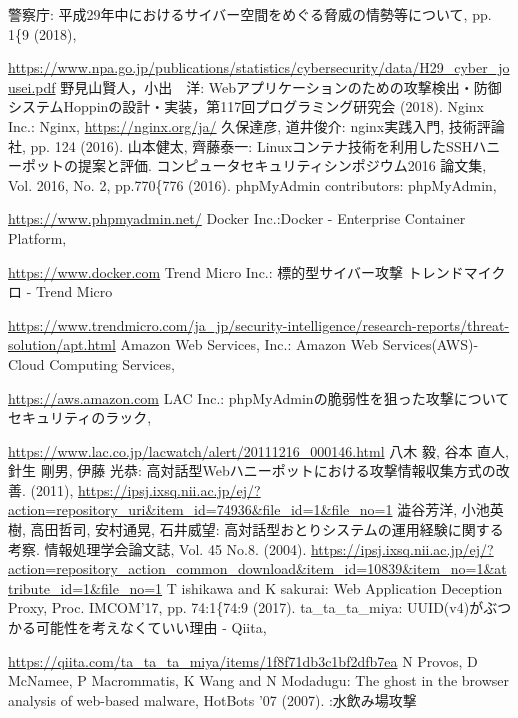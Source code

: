 \documentclass[submit,techrep,noauthor]{ipsj}
\begin{document}
\begin{thebibliography}{16}
 警察庁: 平成29年中におけるサイバー空間をめぐる脅威の情勢等について, pp. 1\{9 (2018),\par
\url{https://www.npa.go.jp/publications/statistics/cybersecurity/data/H29_cyber_jousei.pdf}
 野見山賢人，小出　洋: Webアプリケーションのための攻撃検出・防御システムHoppinの設計・実装，第117回プログラミング研究会  (2018).
 Nginx Inc.: Nginx, \url{https://nginx.org/ja/}
 久保達彦, 道井俊介: nginx実践入門, 技術評論社, pp. 124 (2016).
 山本健太, 齊藤泰一: Linuxコンテナ技術を利用したSSHハニーポットの提案と評価. コンピュータセキュリティシンポジウム2016 論文集, Vol. 2016, No. 2, pp.770\{776 (2016).
 phpMyAdmin contributors: phpMyAdmin, \par
\url{https://www.phpmyadmin.net/}
 Docker Inc.:Docker - Enterprise Container Platform,\par
\url{https://www.docker.com}
 Trend Micro Inc.: 標的型サイバー攻撃 \textbar トレンドマイクロ - Trend Micro\par
\url{https://www.trendmicro.com/ja_jp/security-intelligence/research-reports/threat-solution/apt.html}
 Amazon Web Services, Inc.: Amazon Web Services(AWS)-Cloud Computing Services, \par
\url{https://aws.amazon.com}
 LAC Inc.: phpMyAdminの脆弱性を狙った攻撃について \textbar セキュリティのラック, \par
\url{https://www.lac.co.jp/lacwatch/alert/20111216_000146.html}
 八木 毅, 谷本 直人, 針生 剛男, 伊藤 光恭: 高対話型Webハニーポットにおける攻撃情報収集方式の改善. (2011),
\url{https://ipsj.ixsq.nii.ac.jp/ej/?action=repository_uri&item_id=74936&file_id=1&file_no=1}
 澁谷芳洋, 小池英樹, 高田哲司, 安村通晃, 石井威望: 高対話型おとりシステムの運用経験に関する考察. 情報処理学会論文誌, Vol. 45 No.8. (2004). \url{https://ipsj.ixsq.nii.ac.jp/ej/?action=repository_action_common_download&item_id=10839&item_no=1&attribute_id=1&file_no=1}
 T ishikawa and K sakurai: Web Application Deception Proxy, Proc. IMCOM'17, pp. 74:1\{74:9 (2017).
 ta\_ta\_ta\_miya: UUID(v4)がぶつかる可能性を考えなくていい理由 - Qiita, \par
\url{https://qiita.com/ta_ta_ta_miya/items/1f8f71db3c1bf2dfb7ea}
 N Provos, D McNamee, P Macrommatis, K Wang and N Modadugu: The ghost in the browser analysis of web-based malware, HotBots '07 (2007).
 :水飲み場攻撃
\end{thebibliography}
\end{document}
